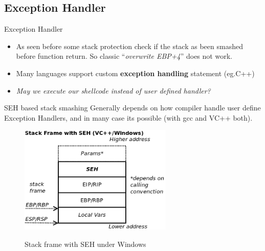 \subsection{Exception Handler}
\begin{frame}{Exception Handler}

\begin{itemize}
\item As seen before some stack protection check if the stack as been smashed before function return. So classic ``\emph{overwrite EBP+4}'' does not work.
\item Many languages support custom {\bf exception handling} statement (eg.C++)
\item \emph{May we execute our shellcode instead of user defined handler?}
\end{itemize}

\begin{block}{SEH based stack smashing}
Generally depends on how compiler handle user define Exception Handlers, and in many case its possible (with gcc and VC++ both).\\
\end{block}

\framebreak
	\begin{figure}
        \includegraphics[width=0.65\textwidth]{imgs/seh-stack-frame.png}
        \label{fig:seh-stack-frame}
        \caption{Stack frame with SEH under Windows}
    \end{figure}	
   

\end{frame}

